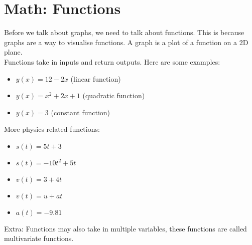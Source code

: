 \documentclass{article}
\begin{document}
\section{Math: Functions}
Before we talk about graphs, we need to talk about functions. This is because graphs are a way to visualise functions. A graph is a plot of a function on a 2D plane.\\[10pt]
Functions take in inputs and return outputs. Here are some examples:
\begin{itemize}
    \item $y(x) = 12-2x$ (linear function)
    \item $y(x) = x^2 + 2x + 1$ (quadratic function)
    \item $y(x) = 3$ (constant function)
\end{itemize}
More physics related functions:
\begin{itemize}
    \item $s(t) = 5t+3$ 
    \item $s(t) = -10t^2 + 5t$
    \item $v(t) = 3 + 4t$
    \item $v(t) = u + at$
    \item $a(t) = -9.81$
\end{itemize}
Extra: Functions may also take in multiple variables, these functions are called multivariate functions.
\end{document}
